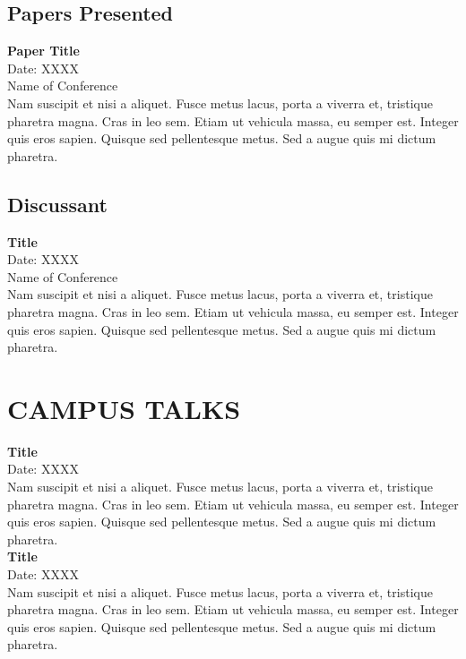 \documentclass{article}
\begin{document}
\subsection*{Papers Presented}
\textbf{Paper Title} \\
Date: XXXX \\
Name of Conference \\
Nam suscipit et nisi a aliquet. Fusce metus lacus, porta a viverra et, tristique pharetra magna. Cras in leo sem. Etiam ut vehicula massa, eu semper est. Integer quis eros sapien. Quisque sed pellentesque metus. Sed a augue quis mi dictum pharetra.

\subsection*{Discussant}
\textbf{Title} \\
Date: XXXX \\
Name of Conference \\
Nam suscipit et nisi a aliquet. Fusce metus lacus, porta a viverra et, tristique pharetra magna. Cras in leo sem. Etiam ut vehicula massa, eu semper est. Integer quis eros sapien. Quisque sed pellentesque metus. Sed a augue quis mi dictum pharetra. 


\section*{CAMPUS TALKS}

\noindent
\newline
\textbf{Title} \\
Date: XXXX \\
Nam suscipit et nisi a aliquet. Fusce metus lacus, porta a viverra et, tristique pharetra magna. Cras in leo sem. Etiam ut vehicula massa, eu semper est. Integer quis eros sapien. Quisque sed pellentesque metus. Sed a augue quis mi dictum pharetra. \\

\noindent
\textbf{Title} \\
Date: XXXX \\
Nam suscipit et nisi a aliquet. Fusce metus lacus, porta a viverra et, tristique pharetra magna. Cras in leo sem. Etiam ut vehicula massa, eu semper est. Integer quis eros sapien. Quisque sed pellentesque metus. Sed a augue quis mi dictum pharetra. \\
\end{document}
